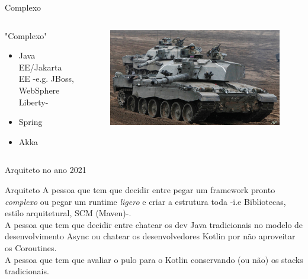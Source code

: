 \documentclass[aspectratio=169]{beamer}
\begin{document}
\begin{frame}{Complexo}

\begin{columns}
\begin{column}{0.5\textwidth}

"Complexo"
\begin{itemize}
\item Java EE/Jakarta EE -e.g. JBoss, WebSphere Liberty-
\item Spring
\item Akka
\end{itemize}
\end{column}
\begin{column}{0.5\textwidth}  %
\begin{figure}
	\centering
	\includegraphics[width=0.9\linewidth]{Images/tank}
\end{figure}
\end{column}
\end{columns}

\end{frame}

\begin{frame}{Arquiteto no ano 2021}

\begin{exampleblock}{Arquiteto}
A pessoa que tem que decidir entre pegar um framework pronto \textit{complexo} ou pegar um runtime \textit{ligero} e criar a estrutura toda -i.e Bibliotecas, estilo arquitetural, SCM (Maven)-.\\


A pessoa que tem que decidir entre chatear os dev Java tradicionais no modelo de desenvolvimento Async ou chatear os desenvolvedores Kotlin por não aproveitar os Coroutines.\\

A pessoa que tem que avaliar o pulo para o Kotlin conservando (ou não) os stacks tradicionais.

\end{exampleblock}
\end{frame}
\end{document}
